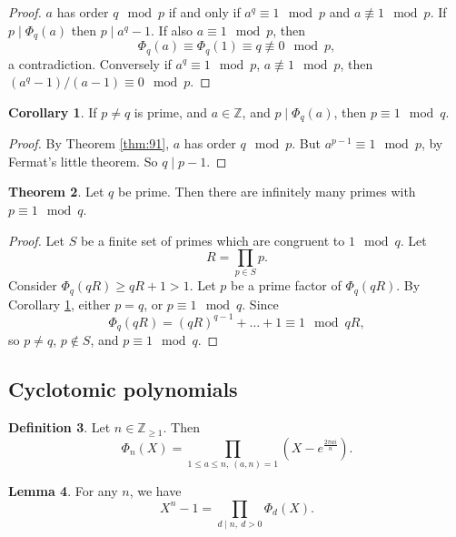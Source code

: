 \documentclass{article}
\newcommand{\Z}{\mathbb{Z}}
\newcommand{\rb}[1]{\left( #1 \right)}
\theoremstyle{definition}\newtheorem{definition}{Definition}
\theoremstyle{definition}\newtheorem{remark}[definition]{Remark}
\theoremstyle{definition}\newtheorem*{example}{Example}
\theoremstyle{definition}\newtheorem*{note}{Note}
\newtheorem{lemma}[definition]{Lemma}
\newtheorem{theorem}[definition]{Theorem}
\newtheorem{corollary}[definition]{Corollary}
\begin{document}
\begin{proof}
$ a $ has order $ q \mod p $ if and only if $ a^q \equiv 1 \mod p $ and $ a \not\equiv 1 \mod p $. If $ p \mid \Phi_q\rb{a} $ then $ p \mid a^q - 1 $. If also $ a \equiv 1 \mod p $, then
$$ \Phi_q\rb{a} \equiv \Phi_q\rb{1} \equiv q \not\equiv 0 \mod p, $$
a contradiction. Conversely if $ a^q \equiv 1 \mod p $, $ a \not\equiv 1 \mod p $, then $ \rb{a^q - 1} / \rb{a - 1} \equiv 0 \mod p $.
\end{proof}


\begin{corollary}
\label{cor:92}
If $ p \ne q $ is prime, and $ a \in \Z $, and $ p \mid \Phi_q\rb{a} $, then $ p \equiv 1 \mod q $.
\end{corollary}

\begin{proof}
By Theorem \ref{thm:91}, $ a $ has order $ q \mod p $. But $ a^{p - 1} \equiv 1 \mod p $, by Fermat's little theorem. So $ q \mid p - 1 $.
\end{proof}

\begin{theorem}
Let $ q $ be prime. Then there are infinitely many primes with $ p \equiv 1 \mod q $.
\end{theorem}

\begin{proof}
Let $ S $ be a finite set of primes which are congruent to $ 1 \mod q $. Let
$$ R = \prod_{p \in S} p. $$
Consider $ \Phi_q\rb{qR} \ge qR + 1 > 1 $. Let $ p $ be a prime factor of $ \Phi_q\rb{qR} $. By Corollary \ref{cor:92}, either $ p = q $, or $ p \equiv 1 \mod q $. Since
$$ \Phi_q\rb{qR} = \rb{qR}^{q - 1} + \dots + 1 \equiv 1 \mod qR, $$
so $ p \ne q $, $ p \notin S $, and $ p \equiv 1 \mod q $.
\end{proof}

\subsection{Cyclotomic polynomials}

\begin{definition}
Let $ n \in \Z_{\ge 1} $. Then
$$ \Phi_n\rb{X} = \prod_{1 \le a \le n, \ \rb{a, n} = 1} \rb{X - e^{\tfrac{2\pi ai}{n}}}. $$
\end{definition}

\begin{lemma}
\label{lem:95}
For any $ n $, we have
$$ X^n - 1 = \prod_{d \mid n, \ d > 0} \Phi_d\rb{X}. $$
\end{lemma}
\end{document}
